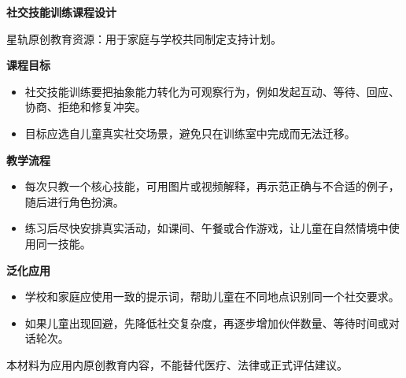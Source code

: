 \documentclass[11pt]{article}
\begin{document}
{\color[HTML]{1F5FD2}\LARGE\bfseries 社交技能训练课程设计\par}
{\color[HTML]{667085}\small 星轨原创教育资源：用于家庭与学校共同制定支持计划。\par}
\vspace{0.8em}
{\color[HTML]{111827}\large\bfseries 课程目标\par}
\begin{itemize}
\item 社交技能训练要把抽象能力转化为可观察行为，例如发起互动、等待、回应、协商、拒绝和修复冲突。
\item 目标应选自儿童真实社交场景，避免只在训练室中完成而无法迁移。
\end{itemize}
{\color[HTML]{111827}\large\bfseries 教学流程\par}
\begin{itemize}
\item 每次只教一个核心技能，可用图片或视频解释，再示范正确与不合适的例子，随后进行角色扮演。
\item 练习后尽快安排真实活动，如课间、午餐或合作游戏，让儿童在自然情境中使用同一技能。
\end{itemize}
{\color[HTML]{111827}\large\bfseries 泛化应用\par}
\begin{itemize}
\item 学校和家庭应使用一致的提示词，帮助儿童在不同地点识别同一个社交要求。
\item 如果儿童出现回避，先降低社交复杂度，再逐步增加伙伴数量、等待时间或对话轮次。
\end{itemize}
\vfill
{\color[HTML]{667085}\footnotesize 本材料为应用内原创教育内容，不能替代医疗、法律或正式评估建议。\par}
\end{document}
